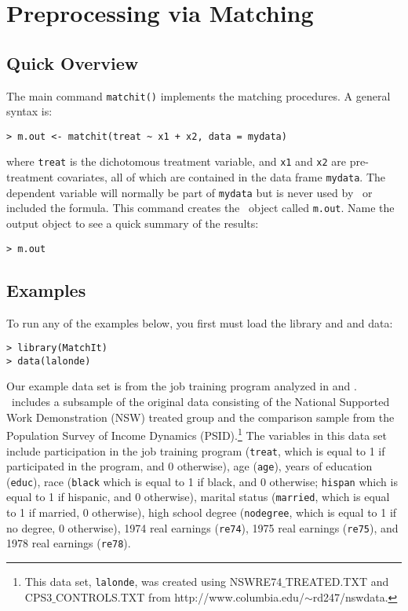 \section{Preprocessing via Matching}
\label{sec:matching}

\subsection{Quick Overview}

The main command \texttt{matchit()} implements the matching
procedures.  A general syntax is:
\begin{verbatim}
> m.out <- matchit(treat ~ x1 + x2, data = mydata)
\end{verbatim}
where {\tt treat} is the dichotomous treatment variable, and {\tt x1}
and {\tt x2} are pre-treatment covariates, all of which are contained
in the data frame {\tt mydata}.  The dependent variable will normally
be part of \texttt{mydata} but is never used by \MatchIt\ or included
the formula.  This command creates the \MatchIt\ object called
\texttt{m.out}.  Name the output object to see a quick summary of the
results:
\begin{verbatim}
> m.out
\end{verbatim}

\subsection{Examples}

To run any of the examples below, you first must load the library and
and data:
\begin{verbatim}
> library(MatchIt)
> data(lalonde)
\end{verbatim}

Our example data set is from the job training program analyzed in
\citet{lalonde86} and \citet{DehWah99}. \MatchIt\ includes a subsample
of the original data consisting of the National Supported Work
Demonstration (NSW) treated group and the comparison sample from the
Population Survey of Income Dynamics (PSID).\footnote{This data set,
  \texttt{lalonde}, was created using NSWRE74$\_$TREATED.TXT and
  CPS3$\_$CONTROLS.TXT from
  http://www.columbia.edu/$\sim$rd247/nswdata.}  The variables in this
data set include participation in the job training program
(\texttt{treat}, which is equal to 1 if participated in the program,
and 0 otherwise), age ({\tt age}), years of education ({\tt educ}),
race (\texttt{black} which is equal to 1 if black, and 0 otherwise;
\texttt{hispan} which is equal to 1 if hispanic, and 0 otherwise),
marital status (\texttt{married}, which is equal to 1 if married, 0
otherwise), high school degree (\texttt{nodegree}, which is equal to 1
if no degree, 0 otherwise), 1974 real earnings (\texttt{re74}), 1975
real earnings (\texttt{re75}), and 1978 real earnings (\texttt{re78}).

